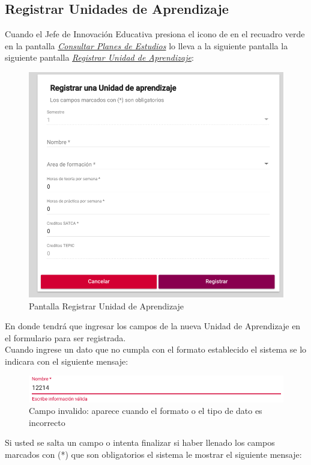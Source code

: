 \subsection{Registrar Unidades de Aprendizaje}
Cuando el Jefe de Innovación Educativa presiona el icono de \IUbutton{+} en el recuadro verde en la pantalla \hyperlink{consultarUA}{\textit{Consultar Planes de Estudios}} lo lleva a la siguiente pantalla la siguiente pantalla \hyperlink{registrarUA}{\textit{Registrar Unidad de Aprendizaje}}:\\
\begin{figure}[!hbtp]
    \centering
    \hypertarget{registrarUA}{\includegraphics[width=0.7\linewidth]{images/GUA/registrarUA}}
    \caption{Pantalla Registrar Unidad de Aprendizaje}
    \label{registrarUA}
\end{figure}
\newpage
En donde tendrá que ingresar los campos de la nueva Unidad de Aprendizaje en el formulario para ser registrada.\\
Cuando ingrese un dato que no cumpla con el formato establecido el sistema se lo indicara con el siguiente mensaje:\\
\begin{figure}[!hbtp]
    \centering
    \hypertarget{invalidoR}{\includegraphics[width=0.7\linewidth]{images/GUA/invalido}}
    \caption{Campo invalido: aparece cuando el formato o el tipo de dato es incorrecto}
    \label{invalidoR}
\end{figure}
Si usted se salta un campo o intenta finalizar si haber llenado los campos marcados con (*) que son obligatorios el sistema le mostrar el siguiente mensaje:\\
